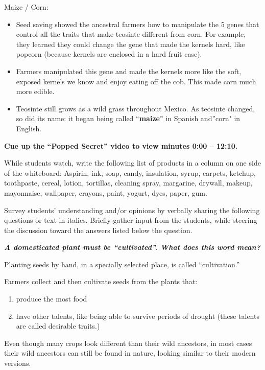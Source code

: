 \documentclass[12pt,]{article}
\providecommand{\tightlist}{%
  \setlength{\itemsep}{0pt}\setlength{\parskip}{0pt}}
\begin{document}
{Maize / Corn}:

\begin{itemize}
\tightlist
\item
  Seed saving showed the ancestral farmers how to manipulate the 5 genes that control all the traits that make teosinte different from corn. For example, they learned they could change the gene that made the kernels hard, like popcorn (because kernels are enclosed in a hard fruit case).
\item
  Farmers manipulated this gene and made the kernels more like the soft, exposed kernels we know and enjoy eating off the cob. This made corn much more edible.
\item
  Teosinte still grows as a wild grass throughout Mexico. As teosinte changed, so did its name: it began being called ``\textbf{maize"} in Spanish and''corn" in English.
\end{itemize}

\textbf{Cue up the ``Popped Secret'' video to view minutes 0:00 -- 12:10.}

While students watch, write the following list of products in a column on one side of the whiteboard: Aspirin, ink, soap, candy, insulation, syrup, carpets, ketchup, toothpaste, cereal, lotion, tortillas, cleaning spray, margarine, drywall, makeup, mayonnaise, wallpaper, crayons, paint, yogurt, dyes, paper, gum.

Survey students' understanding and/or opinions by verbally sharing the following questions or text in italics. Briefly gather input from the students, while steering the discussion toward the answers listed below the question.

\textbf{\emph{A domesticated plant must be ``cultivated''. What does this word mean?}}

Planting seeds by hand, in a specially selected place, is called ``cultivation.''

Farmers collect and then cultivate seeds from the plants that:

\begin{enumerate}
\def\labelenumi{\arabic{enumi}.}
\tightlist
\item
  produce the most food
\item
  have other talents, like being able to survive periods of drought (these talents are called desirable traits.)
\end{enumerate}

Even though many crops look different than their wild ancestors, in most cases their wild ancestors can still be found in nature, looking similar to their modern versions.
\end{document}
